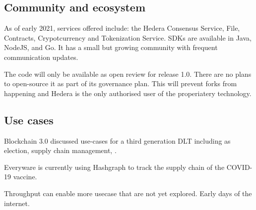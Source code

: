 \subsection{Community and ecosystem}

As of early 2021, services offered include: the Hedera Consensus Service, File, Contracts, Crypotcurrency and Tokenization Service. SDKs are available in Java, NodeJS, and Go. It has a small but growing community with frequent communication updates.

The code will only be available as open review for release 1.0. There are no plans to open-source it as part of its governance plan. This will prevent forks from happening and Hedera is the only authorised user of the properiatery technology.

\subsection{Use cases}

Blockchain 3.0 \cite{maesa2020blockchain} discussed use-cases for a third generation DLT including as election, supply chain management, .


Everyware is currently using Hashgraph to track the supply chain of the COVID-19 vaccine.



Throughput can enable more usecase that are not yet explored. Early days of the internet.
